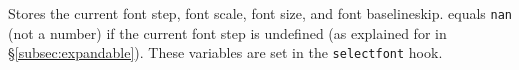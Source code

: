 \documentclass{beery}
\begin{document}
\begin{mydisplaycode}
  \nopagebreak\newline
  \newline
  \nopagebreak\newline
\end{mydisplaycode}

Stores the current font step, font scale, font size, and font baselineskip.
 equals \texttt{nan} (not a number) if the current font step is undefined (as explained for  in \S\ref{subsec:expandable}).
These variables are set in the \texttt{selectfont} hook.
\end{document}
